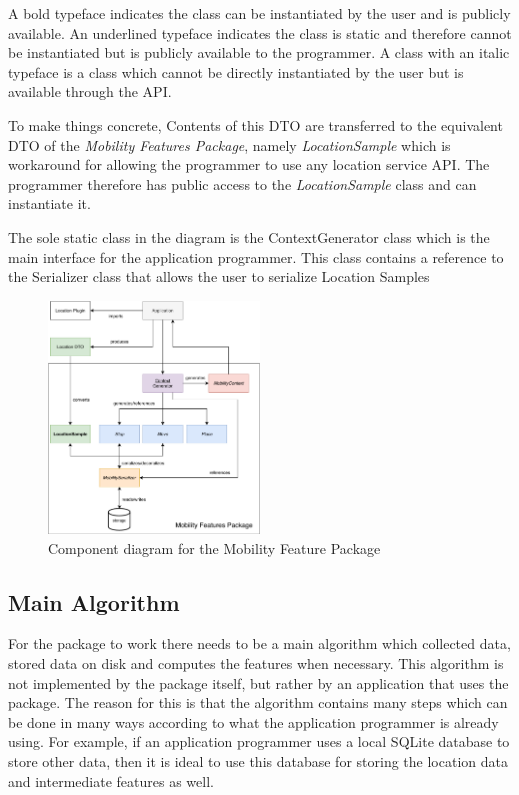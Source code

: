 A bold typeface indicates the class can be instantiated by the user and is publicly available. An underlined typeface indicates the class is static and therefore cannot be instantiated but is publicly available to the programmer. A class with an italic typeface is a class which cannot be directly instantiated by the user but is available through the API. 
 
 To make things concrete, Contents of this DTO are transferred to the equivalent DTO of the \textit{Mobility Features Package}, namely \textit{LocationSample} which is workaround for allowing the programmer to use any location service API. The programmer therefore has public access to the \textit{LocationSample} class and can instantiate it.

The sole static class in the diagram is the ContextGenerator class which is the main interface for the application programmer. This class contains a reference to the Serializer class that allows the user to serialize Location Samples

\begin{figure}[h]
    \centering
    \includegraphics[width=0.5\textwidth]{images/diagrams/api-diagram.pdf}
    \caption{Component diagram for the Mobility Feature Package}
    \label{fig:component-diagram}
\end{figure}










\subsection{Main Algorithm}
For the package to work there needs to be a main algorithm which collected data, stored data on disk and computes the features when necessary. This algorithm is not implemented by the package itself, but rather by an application that uses the package. The reason for this is that the algorithm contains many steps which can be done in many ways according to what the application programmer is already using. For example, if an application programmer uses a local SQLite database to store other data, then it is ideal to use this database for storing the location data and intermediate features as well.

